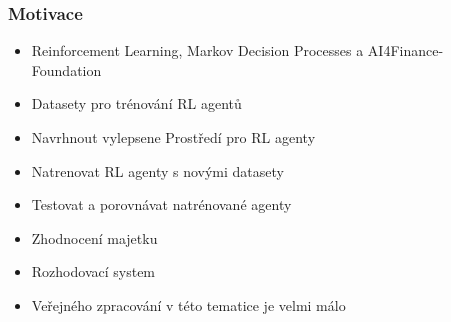 




\begin{frame}
    \frametitle{Motivace}
    \begin{itemize}
        \itemsep1em
        \item Reinforcement Learning, Markov Decision Processes a AI4Finance-Foundation
        \item Datasety pro trénování RL agentů
        \item Navrhnout vylepsene Prostředí pro RL agenty
        \item Natrenovat RL agenty s novými datasety
        \item Testovat a porovnávat natrénované agenty
        \item Zhodnocení majetku
        \item Rozhodovací system
        \item Veřejného zpracování v této tematice je velmi málo
    \end{itemize}
\end{frame}

